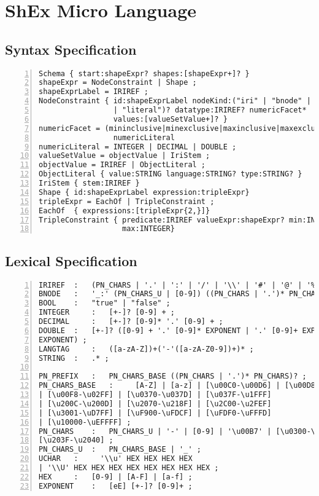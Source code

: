 \chapter{ShEx Micro Language}
\section{Syntax Specification}
\begin{lstlisting}[numbers=left,basicstyle=\ttfamily\scriptsize]
Schema { start:shapeExpr? shapes:[shapeExpr+]? }
shapeExpr =	NodeConstraint | Shape ;
shapeExprLabel = IRIREF ;
NodeConstraint { id:shapeExprLabel nodeKind:("iri" | "bnode" | "nonliteral"
                 | "literal")? datatype:IRIREF? numericFacet*
                 values:[valueSetValue+]? }
numericFacet = (mininclusive|minexclusive|maxinclusive|maxexclusive):
                 numericLiteral
numericLiteral = INTEGER | DECIMAL | DOUBLE ;
valueSetValue = objectValue | IriStem ;
objectValue = IRIREF | ObjectLiteral ;
ObjectLiteral { value:STRING language:STRING? type:STRING? }
IriStem { stem:IRIREF }
Shape { id:shapeExprLabel expression:tripleExpr}
tripleExpr = EachOf | TripleConstraint ;
EachOf  { expressions:[tripleExpr{2,}]}
TripleConstraint { predicate:IRIREF valueExpr:shapeExpr? min:INTEGER?
                   max:INTEGER}
\end{lstlisting}

\section{Lexical Specification}
\begin{lstlisting}[numbers=left,basicstyle=\ttfamily\scriptsize]
IRIREF 	:	(PN_CHARS | '.' | ':' | '/' | '\\' | '#' | '@' | '%' | '&' | UCHAR)* ;
BNODE 	:	'_:' (PN_CHARS_U | [0-9]) ((PN_CHARS | '.')* PN_CHARS)? ;
BOOL 	:	"true" | "false" ;
INTEGER 	:	[+-]? [0-9] + ;
DECIMAL 	:	[+-]? [0-9]* '.' [0-9] + ;
DOUBLE 	:	[+-]? ([0-9] + '.' [0-9]* EXPONENT | '.' [0-9]+ EXPONENT | [0-9]+
EXPONENT) ;
LANGTAG 	:	([a-zA-Z])+('-'([a-zA-Z0-9])+)* ;
STRING 	:	.* ;

PN_PREFIX 	:	PN_CHARS_BASE ((PN_CHARS | '.')* PN_CHARS)? ;
PN_CHARS_BASE 	:	  [A-Z] | [a-z] | [\u00C0-\u00D6] | [\u00D8-\u00F6]
| [\u00F8-\u02FF] | [\u0370-\u037D] | [\u037F-\u1FFF]
| [\u200C-\u200D] | [\u2070-\u218F] | [\u2C00-\u2FEF]
| [\u3001-\uD7FF] | [\uF900-\uFDCF] | [\uFDF0-\uFFFD]
| [\u10000-\uEFFFF] ;
PN_CHARS 	:	PN_CHARS_U | '-' | [0-9] | '\u00B7' | [\u0300-\u036F] |
[\u203F-\u2040] ;
PN_CHARS_U 	:	PN_CHARS_BASE | '_' ;
UCHAR 	:	  '\\u' HEX HEX HEX HEX
| '\\U' HEX HEX HEX HEX HEX HEX HEX HEX ;
HEX 	:	[0-9] | [A-F] | [a-f] ;
EXPONENT 	:	[eE] [+-]? [0-9]+ ;
\end{lstlisting}